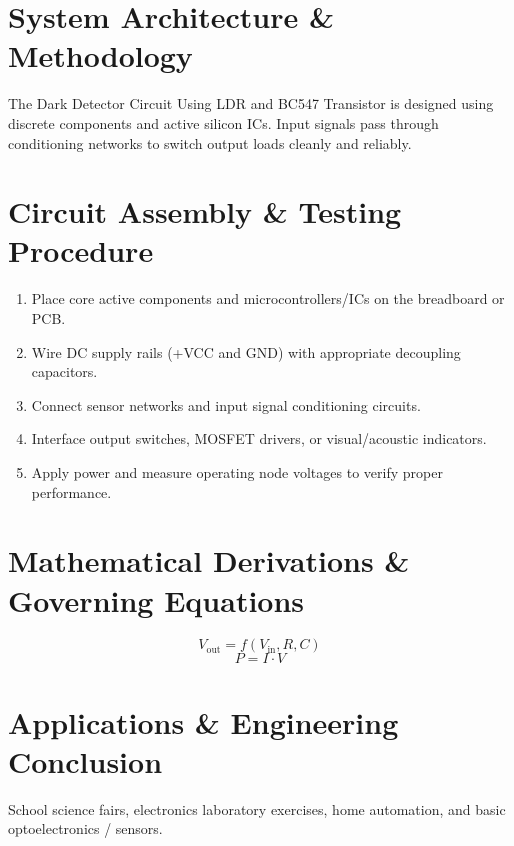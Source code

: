 \documentclass[11pt,a4paper]{article}
\begin{document}
\section{System Architecture \& Methodology}
The Dark Detector Circuit Using LDR and BC547 Transistor is designed using discrete components and active silicon ICs. Input signals pass through conditioning networks to switch output loads cleanly and reliably.

\section{Circuit Assembly \& Testing Procedure}
\begin{enumerate}
    \item Place core active components and microcontrollers/ICs on the breadboard or PCB.
    \item Wire DC supply rails (+VCC and GND) with appropriate decoupling capacitors.
    \item Connect sensor networks and input signal conditioning circuits.
    \item Interface output switches, MOSFET drivers, or visual/acoustic indicators.
    \item Apply power and measure operating node voltages to verify proper performance.
\end{enumerate}

\section{Mathematical Derivations \& Governing Equations}
\begin{equation}
V_{\text{out}} = f(V_{\text{in}}, R, C)
\end{equation}
\begin{equation}
P = I \cdot V
\end{equation}

\section{Applications \& Engineering Conclusion}
School science fairs, electronics laboratory exercises, home automation, and basic optoelectronics / sensors.
\end{document}
